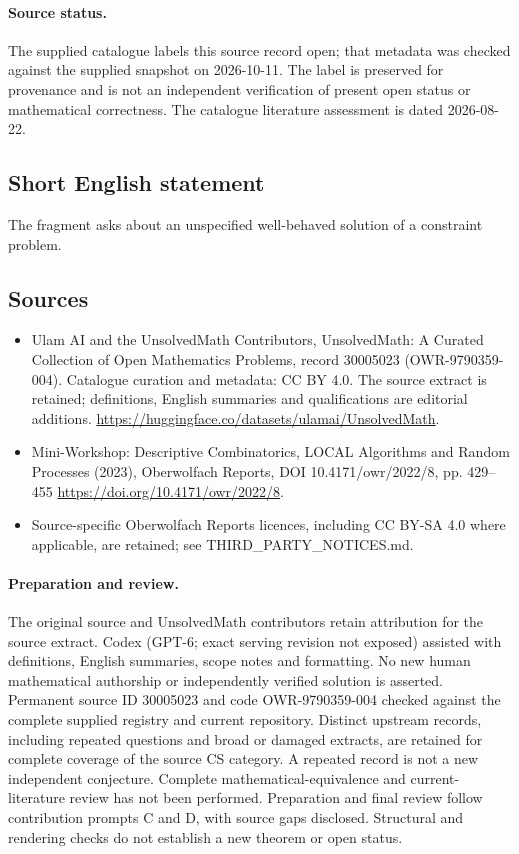 \documentclass[11pt]{article}
\begin{document}
\paragraph{Source status.}
The supplied catalogue labels this source record open; that metadata was checked against the supplied snapshot on 2026-10-11. The label is preserved for provenance and is not an independent verification of present open status or mathematical correctness. The catalogue literature assessment is dated 2026-08-22.
\subsection{Short English statement}
The fragment asks about an unspecified well-behaved solution of a constraint problem.
\subsection{Sources}
\begin{itemize}
\item[\hypertarget{source:30005023:1}{S1}] Ulam AI and the UnsolvedMath Contributors, UnsolvedMath: A Curated Collection of Open Mathematics Problems, record 30005023 (OWR-9790359-004). Catalogue curation and metadata: CC BY 4.0. The source extract is retained; definitions, English summaries and qualifications are editorial additions.
\url{https://huggingface.co/datasets/ulamai/UnsolvedMath}.
\item[\hypertarget{source:30005023:2}{S2}] Mini-Workshop: Descriptive Combinatorics, LOCAL Algorithms and Random Processes (2023), Oberwolfach Reports, DOI 10.4171/owr/2022/8, pp. 429--455
\url{https://doi.org/10.4171/owr/2022/8}.
\item Source-specific Oberwolfach Reports licences, including CC BY-SA 4.0 where applicable, are retained; see THIRD\_PARTY\_NOTICES.md.
\end{itemize}
\paragraph{Preparation and review.}
The original source and UnsolvedMath contributors retain attribution for the source extract. Codex (GPT-6; exact serving revision not exposed) assisted with definitions, English summaries, scope notes and formatting. No new human mathematical authorship or independently verified solution is asserted. Permanent source ID 30005023 and code OWR-9790359-004 checked against the complete supplied registry and current repository. Distinct upstream records, including repeated questions and broad or damaged extracts, are retained for complete coverage of the source CS category. A repeated record is not a new independent conjecture. Complete mathematical-equivalence and current-literature review has not been performed. Preparation and final review follow contribution prompts C and D, with source gaps disclosed. Structural and rendering checks do not establish a new theorem or open status.
\label{end:30005023}
\end{document}

